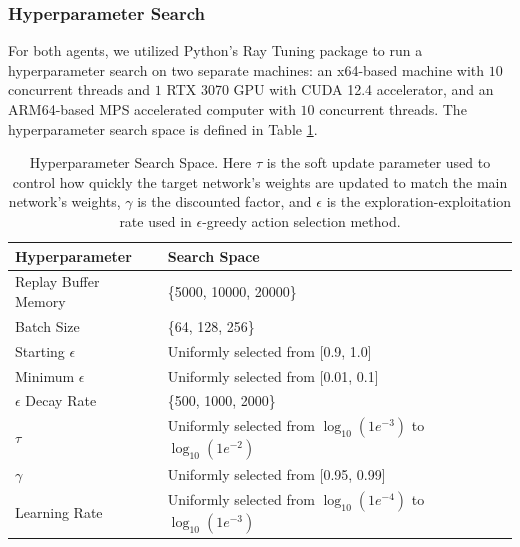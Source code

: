\documentclass{article}
\begin{document}
\subsubsection{Hyperparameter Search}
For both agents, we utilized Python's Ray Tuning package to run a hyperparameter search on two separate machines: an x64-based machine with $10$ concurrent threads and $1$ RTX 3070 GPU with CUDA 12.4 accelerator, and an ARM64-based MPS accelerated computer with $10$ concurrent threads. The hyperparameter search space is defined in Table \ref{tab:hyperparameter_search_space}.
\begin{table}[!ht]
\centering
\begin{tabular}{|l|l|}
\hline
\textbf{Hyperparameter} & \textbf{Search Space}     \\ \hline
Replay Buffer Memory    & \{5000, 10000, 20000\}    \\ \hline
Batch Size  & \{64, 128, 256\}          \\ \hline
Starting $\epsilon$     & Uniformly selected from [0.9, 1.0]    \\ \hline
Minimum $\epsilon$      & Uniformly selected from [0.01, 0.1]   \\ \hline
$\epsilon$ Decay Rate   & \{500, 1000, 2000\}   \\ \hline
$\tau$  & Uniformly selected from $\log_{10}(1e^{-3})$ to $\log_{10}(1e^{-2})$  \\ \hline
$\gamma$    & Uniformly selected from [0.95, 0.99]  \\ \hline
Learning Rate   & Uniformly selected from $\log_{10}(1e^{-4})$ to $\log_{10}(1e^{-3})$  \\ \hline
\end{tabular}
\caption{Hyperparameter Search Space. Here $\tau$ is the soft update parameter used to control how quickly the target network's weights are updated to match the main network's weights, $\gamma$ is the discounted factor, and $\epsilon$ is the exploration-exploitation rate used in $\epsilon$-greedy action selection method.}
\label{tab:hyperparameter_search_space}
\end{table}
\end{document}
